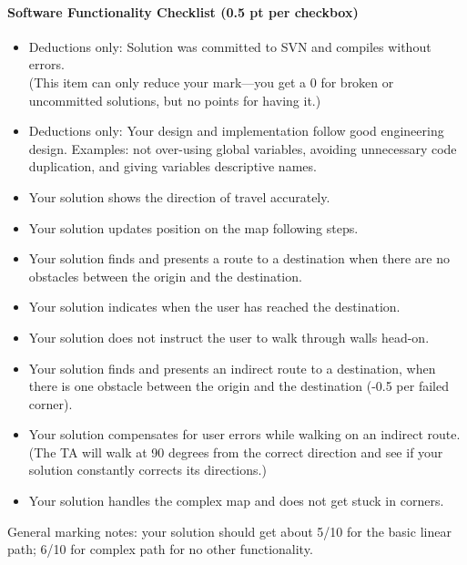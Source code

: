 \documentclass[10pt]{article}
\begin{document}
\paragraph{Software Functionality Checklist (0.5 pt per checkbox)}
\begin{itemize}
\renewcommand{\labelitemi}{$\Box$}
\item Deductions only: Solution was committed to SVN and compiles without errors. \\
(This item can only reduce your mark---you get a 0 for broken or uncommitted solutions, but no points for having it.)
\renewcommand{\labelitemi}{$\Box\Box$}
\item Deductions only: Your design and implementation follow good engineering design. Examples: not over-using global variables, avoiding unnecessary code duplication, and giving variables descriptive names.
\renewcommand{\labelitemi}{$\Box$}
\item Your solution shows the direction of travel accurately.
\renewcommand{\labelitemi}{$\Box\Box\Box\Box\Box$}
\item Your solution updates position on the map following steps.
\item Your solution finds and presents a route to a destination when there are no obstacles between the origin and the destination.
\renewcommand{\labelitemi}{$\Box$}
\item Your solution indicates when the user has reached the destination.
\renewcommand{\labelitemi}{$\Box\Box$}
\item Your solution does not instruct the user to walk through walls head-on.
\item Your solution finds and presents an indirect route to a destination, when there is one obstacle between the origin and the destination (-0.5 per failed corner).
\renewcommand{\labelitemi}{$\Box\Box$}
\item Your solution compensates for user errors while walking on an indirect route. (The TA will walk at 90 degrees from the correct direction and see if your solution constantly corrects its directions.)
\renewcommand{\labelitemi}{$\Box\Box$}
\item Your solution handles the complex map and does not get stuck in corners.
\end{itemize}

General marking notes: your solution should get about 5/10 for the basic linear path; 6/10 for complex path for no other functionality.

\newpage
\end{document}
